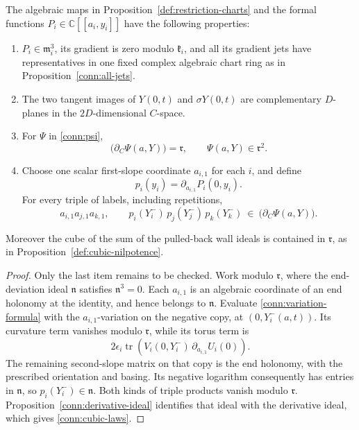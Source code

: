 \begin{corollary}
\label{conn:output}
The algebraic maps in
Proposition~\ref{def:restriction-charts} and the formal functions
\(P_i\in\mathbb C[[a_i,y_i]]\) have the following properties:
\begin{enumerate}
\item \(P_i\in\mathfrak m_i^3\), its gradient is zero modulo
      \(\mathfrak k_i\), and all its gradient jets have
      representatives in one fixed complex algebraic
      chart ring as in Proposition~\ref{conn:all-jets}.
\item The two tangent images of \(Y(0,t)\) and
      \(\sigma Y(0,t)\) are complementary \(D\)-planes
      in the \(2D\)-dimensional \(C\)-space.
\item For \(\Psi\) in \eqref{conn:psi},
\[
  \bigl(\partial_C\Psi(a,Y)\bigr)=\mathfrak r,\qquad
                   \Psi(a,Y)\in\mathfrak r^2 .
\]
\item Choose one scalar first-slope coordinate \(a_{i,1}\)
      for each \(i\), and define
\begin{equation}
 p_i(y_i)=\partial_{a_{i,1}}P_i(0,y_i).
 \label{conn:p-functions}
\end{equation}
      For every triple of labels, including repetitions,
\begin{equation}
 a_{i,1}a_{j,1}a_{k,1},\qquad
 p_i(Y_i^-)\,p_j(Y_j^-)\,p_k(Y_k^-)
                 \ \in\ \bigl(\partial_C\Psi(a,Y)\bigr).
 \label{conn:cubic-laws}
\end{equation}
\end{enumerate}
Moreover the cube of the sum of the pulled-back wall
ideals is contained in \(\mathfrak r\), as in
Proposition~\ref{def:cubic-nilpotence}.
\end{corollary}

\begin{proof}
Only the last item remains to be checked.  Work modulo
\(\mathfrak r\), where the end-deviation ideal
\(\mathfrak n\) satisfies \(\mathfrak n^3=0\).
Each \(a_{i,1}\) is an algebraic coordinate of an end
holonomy at the identity, and hence belongs to
\(\mathfrak n\).  Evaluate
\eqref{conn:variation-formula} with the
\(a_{i,1}\)-variation on the negative copy,
at \((0,Y_i^-(a,t))\).  Its curvature term vanishes
modulo \(\mathfrak r\), while its torus term is
\[
 2\epsilon_i\operatorname{tr}
       \left(V_i(0,Y_i^-)\,
                    \partial_{a_{i,1}}U_i(0)\right).
\]
The remaining second-slope matrix on that copy
is the end holonomy, with the prescribed orientation
and basing.  Its negative logarithm consequently
has entries in \(\mathfrak n\), so
\(p_i(Y_i^-)\in\mathfrak n\).
Both kinds of triple products vanish modulo
\(\mathfrak r\).  Proposition~\ref{conn:derivative-ideal}
identifies that ideal with the derivative ideal,
which gives \eqref{conn:cubic-laws}.
\end{proof}
